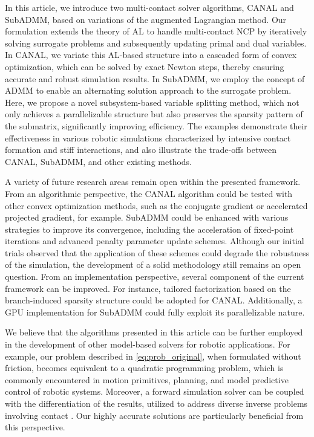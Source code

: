 \documentclass[lettersize,journal]{IEEEtran}
\begin{document}
In this article, we introduce two multi-contact solver algorithms, CANAL and SubADMM, based on variations of the augmented Lagrangian method. Our formulation extends the theory of AL to handle multi-contact NCP by iteratively solving surrogate problems and subsequently updating primal and dual variables. 
In CANAL, we variate this AL-based structure into a cascaded form of convex optimization, which can be solved by exact Newton steps, thereby ensuring accurate and robust simulation results. 
In SubADMM, we employ the concept of ADMM to enable an alternating solution approach to the surrogate problem. Here, we propose a novel subsystem-based variable splitting method, which not only achieves a parallelizable structure but also preserves the sparsity pattern of the submatrix, significantly improving efficiency.
The examples demonstrate their effectiveness in various robotic simulations characterized by intensive contact formation and stiff interactions, and also illustrate the trade-offs between CANAL, SubADMM, and other existing methods.


A variety of future research areas remain open within the presented framework. From an algorithmic perspective, the CANAL algorithm could be tested with other convex optimization methods, such as the conjugate gradient \cite{fletcher1964function} or accelerated projected gradient\cite{lee2022large}, for example. SubADMM could be enhanced with various strategies to improve its convergence, including the acceleration of fixed-point iterations \cite{themelis2019supermann} and advanced penalty parameter update schemes. Although our initial trials observed that the application of these schemes could degrade the robustness of the simulation, the development of a solid methodology still remains an open question.
From an implementation perspective, several component of the current framework can be improved. For instance, tailored factorization based on the branch-induced sparsity structure could be adopted for CANAL. 
Additionally, a GPU implementation for SubADMM could fully exploit its parallelizable nature.

We believe that the algorithms presented in this article can be further employed in the development of other model-based solvers for robotic applications. For example, our problem described in \eqref{eq:prob_original}, when formulated without friction, becomes equivalent to a quadratic programming problem, which is commonly encountered in motion primitives, planning, and model predictive control of robotic systems. Moreover, a forward simulation solver can be coupled with the differentiation of the results, utilized to address diverse inverse problems involving contact \cite{howell2022dojo}. Our highly accurate solutions are particularly beneficial from this perspective.
\end{document}
